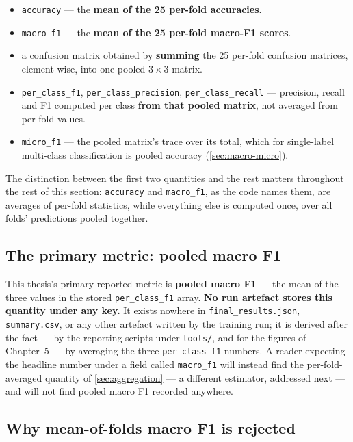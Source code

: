 \begin{itemize}
	\item \texttt{accuracy} --- the \textbf{mean of the 25 per-fold accuracies}.
	\item \texttt{macro\_f1} --- the \textbf{mean of the 25 per-fold macro-F1 scores}.
	\item a confusion matrix obtained by \textbf{summing} the 25 per-fold confusion matrices, element-wise, into one pooled $3\times3$ matrix.
	\item \texttt{per\_class\_f1}, \texttt{per\_class\_precision}, \texttt{per\_class\_recall} --- precision, recall and F1 computed per class \textbf{from that pooled matrix}, not averaged from per-fold values.
	\item \texttt{micro\_f1} --- the pooled matrix's trace over its total, which for single-label multi-class classification is pooled accuracy (\autoref{sec:macro-micro}).
\end{itemize}

The distinction between the first two quantities and the rest matters throughout the rest of this section: \texttt{accuracy} and \texttt{macro\_f1}, as the code names them, are averages of per-fold statistics, while everything else is computed once, over all folds' predictions pooled together.

\subsection{The primary metric: pooled macro F1}
\label{sec:primary-metric}

This thesis's primary reported metric is \textbf{pooled macro F1} --- the mean of the three values in the stored \texttt{per\_class\_f1} array. \textbf{No run artefact stores this quantity under any key.} It exists nowhere in \texttt{final\_results.json}, \texttt{summary.csv}, or any other artefact written by the training run; it is derived after the fact --- by the reporting scripts under \texttt{tools/}, and for the figures of Chapter~5 --- by averaging the three \texttt{per\_class\_f1} numbers. A reader expecting the headline number under a field called \texttt{macro\_f1} will instead find the per-fold-averaged quantity of \autoref{sec:aggregation} --- a different estimator, addressed next --- and will not find pooled macro F1 recorded anywhere.

\subsection{Why mean-of-folds macro F1 is rejected}
\label{sec:mean-of-folds-rejected}

